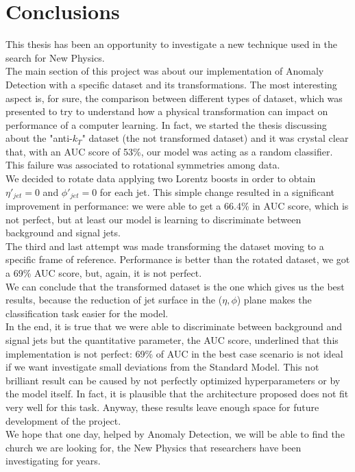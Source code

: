 \chapter{Conclusions}\label{chap:Conclusions}
This thesis has been an opportunity to investigate a new technique used in the search for New Physics.\\
The main section of this project was about our implementation of Anomaly Detection with a specific dataset and its transformations. The most interesting aspect is, for sure, the comparison between different types of dataset, which was presented to try to understand how a physical transformation can impact on performance of a computer learning. In fact, we started the thesis discussing about the "anti-$k_T$" dataset (the not transformed dataset) and it was crystal clear that, with an AUC score of 53\%, our model was acting as a random classifier. This failure was associated to rotational symmetries among data.\\
We decided to rotate data applying two Lorentz boosts in order to obtain $\eta'_{jet}=0$ and $\phi'_{jet}=0$ for each jet. This simple change resulted in a significant improvement in performance: we were able to get a 66.4\% in AUC score, which is not perfect, but at least our model is learning to discriminate between background and signal jets.\\
The third and last attempt was made transforming the dataset moving to a specific frame of reference. Performance is better than the rotated dataset, we got a 69\% AUC score, but, again, it is not perfect. \\
We can conclude that the transformed dataset is the one which gives us the best results, because the reduction of jet surface in the ($\eta , \phi $) plane makes the classification task easier for the model.\\
In the end, it is true that we were able to discriminate between background and signal jets but the quantitative parameter, the AUC score, underlined that this implementation is not perfect: 69\% of AUC in the best case scenario is not ideal if we want investigate small deviations from the Standard Model. This not brilliant result can be caused by not perfectly optimized hyperparameters or by the model itself. In fact, it is plausible that the architecture proposed does not fit very well for this task. Anyway, these results leave enough space for future development of the project. \\
We hope that one day, helped by Anomaly Detection, we will be able to find the church we are looking for, the New Physics that researchers have been investigating for years. 